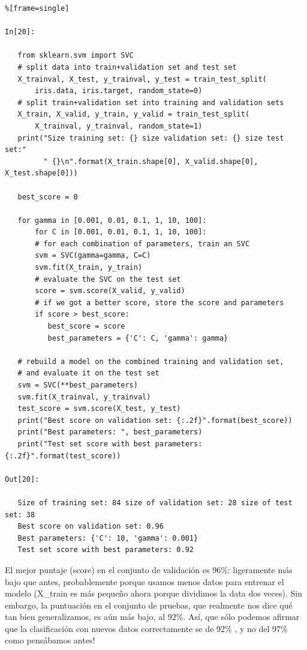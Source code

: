 \begin{lstlisting}%[frame=single]

In[20]:

   from sklearn.svm import SVC
   # split data into train+validation set and test set
   X_trainval, X_test, y_trainval, y_test = train_test_split(
       iris.data, iris.target, random_state=0)
   # split train+validation set into training and validation sets
   X_train, X_valid, y_train, y_valid = train_test_split(
       X_trainval, y_trainval, random_state=1)
   print("Size training set: {} size validation set: {} size test set:" 
         " {}\n".format(X_train.shape[0], X_valid.shape[0], X_test.shape[0]))
         
   best_score = 0

   for gamma in [0.001, 0.01, 0.1, 1, 10, 100]:
       for C in [0.001, 0.01, 0.1, 1, 10, 100]:
       # for each combination of parameters, train an SVC
       svm = SVC(gamma=gamma, C=C)
       svm.fit(X_train, y_train)
       # evaluate the SVC on the test set
       score = svm.score(X_valid, y_valid)
       # if we got a better score, store the score and parameters
       if score > best_score:
          best_score = score
          best_parameters = {'C': C, 'gamma': gamma}
          
   # rebuild a model on the combined training and validation set,
   # and evaluate it on the test set
   svm = SVC(**best_parameters)
   svm.fit(X_trainval, y_trainval)
   test_score = svm.score(X_test, y_test)
   print("Best score on validation set: {:.2f}".format(best_score))
   print("Best parameters: ", best_parameters)
   print("Test set score with best parameters: {:.2f}".format(test_score))

Out[20]:
   
   Size of training set: 84 size of validation set: 28 size of test set: 38
   Best score on validation set: 0.96
   Best parameters: {'C': 10, 'gamma': 0.001}
   Test set score with best parameters: 0.92

\end{lstlisting}

El mejor puntaje (score) en el conjunto de validación es 96\%: ligeramente más bajo que antes, probablemente
porque usamos menos datos para entrenar el modelo ({\ttfamily X\_train} es más pequeño ahora porque dividimos la data dos veces). Sin embargo, la puntuación en el conjunto de pruebas, que realmente nos dice qué tan bien generalizamos, es aún más bajo, al 92\%. Así, que sólo podemos afirmar que la  clasificación con  nuevos datos correctamente  se de  92\% , y no del 97\%  como pensábamos antes!

